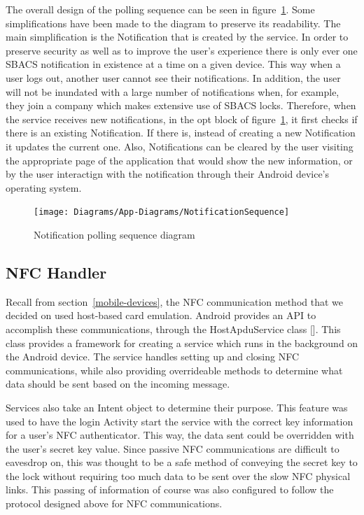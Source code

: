 \documentclass[12pt]{report}
\let\Oldsubsection\subsection
\renewcommand{\subsection}{\FloatBarrier\Oldsubsection}
\begin{document}
The overall design of the polling sequence can be seen in figure~\ref{fig:notfication-sequence}. Some simplifications
have been made to the diagram to preserve its readability. The main simplification is the Notification that is created
by the service. In order to preserve security as well as to improve the user's experience there is only ever one SBACS
notification in existence at a time on a given device. This way when a user logs out, another user cannot see their
notifications. In addition, the user will not be inundated with a large number of notifications when, for example, they
join a company which makes extensive use of SBACS locks. Therefore, when the service receives new notifications, in the
opt block of figure~\ref{fig:notfication-sequence}, it first checks if there is an existing Notification. If there is,
instead of creating a new Notification it updates the current one. Also, Notifications can be cleared by the user
visiting the appropriate page of the application that would show the new information, or by the user interactign with
the notification through their Android device's operating system.

\begin{figure}
    \centering
    \texttt{[image: Diagrams/App-Diagrams/NotificationSequence]}
    \caption{Notification polling sequence diagram}
    \label{fig:notfication-sequence}
\end{figure}


\subsection{NFC Handler} \label{nfc-handler}

Recall from section~\ref{mobile-devices}, the NFC communication method that we decided on used host-based card emulation. Android provides
an API to accomplish these communications, through the HostApduService class []. This class provides a framework for
creating a service which runs in the background on the Android device. The service handles setting up and closing NFC
communications, while also providing overrideable methods to determine what data should be sent based on the incoming
message.

Services also take an Intent object to determine their purpose. This feature was used to have the login Activity start
the service with the correct key information for a user's NFC authenticator. This way, the data sent could be overridden
with the user's secret key value. Since passive NFC communications are difficult to eavesdrop on, this was thought to be
a safe method of conveying the secret key to the lock without requiring too much data to be sent over the slow NFC
physical links. This passing of information of course was also configured to follow the protocol designed above for NFC
communications.
\end{document}
